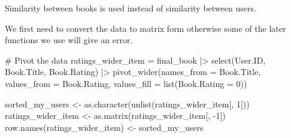 \documentclass[
]{report}
\newenvironment{Shaded}{\begin{snugshade}}{\end{snugshade}}
\newcommand{\AttributeTok}[1]{\textcolor[rgb]{0.40,0.45,0.13}{#1}}
\newcommand{\CommentTok}[1]{\textcolor[rgb]{0.37,0.37,0.37}{#1}}
\newcommand{\DecValTok}[1]{\textcolor[rgb]{0.68,0.00,0.00}{#1}}
\newcommand{\FunctionTok}[1]{\textcolor[rgb]{0.28,0.35,0.67}{#1}}
\newcommand{\NormalTok}[1]{\textcolor[rgb]{0.00,0.23,0.31}{#1}}
\newcommand{\OtherTok}[1]{\textcolor[rgb]{0.00,0.23,0.31}{#1}}
\newcommand{\SpecialCharTok}[1]{\textcolor[rgb]{0.37,0.37,0.37}{#1}}
\begin{document}
Similarity between books is used instead of similarity between users.

We first need to convert the data to matrix form otherwise some of the
later functions we use will give an error.

\begin{Shaded}
\begin{Highlighting}[]
\CommentTok{\# Pivot the data}
\NormalTok{ratings\_wider\_item }\OtherTok{=}\NormalTok{ final\_book }\SpecialCharTok{|\textgreater{}} 
  \FunctionTok{select}\NormalTok{(User.ID, Book.Title, Book.Rating) }\SpecialCharTok{|\textgreater{}}
  \FunctionTok{pivot\_wider}\NormalTok{(}\AttributeTok{names\_from =}\NormalTok{ Book.Title, }
              \AttributeTok{values\_from =}\NormalTok{ Book.Rating, }
              \AttributeTok{values\_fill =} \FunctionTok{list}\NormalTok{(}\AttributeTok{Book.Rating =} \DecValTok{0}\NormalTok{))}

\NormalTok{sorted\_my\_users }\OtherTok{\textless{}{-}} \FunctionTok{as.character}\NormalTok{(}\FunctionTok{unlist}\NormalTok{(ratings\_wider\_item[, }\DecValTok{1}\NormalTok{]))}
\NormalTok{ratings\_wider\_item  }\OtherTok{\textless{}{-}} \FunctionTok{as.matrix}\NormalTok{(ratings\_wider\_item[, }\SpecialCharTok{{-}}\DecValTok{1}\NormalTok{])}
\FunctionTok{row.names}\NormalTok{(ratings\_wider\_item) }\OtherTok{\textless{}{-}}\NormalTok{ sorted\_my\_users}
\end{Highlighting}
\end{Shaded}
\end{document}
